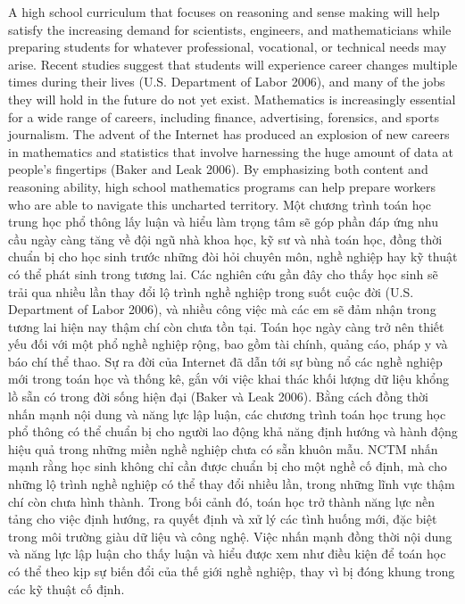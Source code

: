 \documentclass[
  10pt,
  a4paper,
  landscape,
  twoside,
  openany
]{scrbook}
\newcommand{\EN}[1]{#1}
\newcommand{\VI}[1]{#1}
\newcommand{\NOTE}[1]{#1}
\begin{document}
\TriPara
{
\EN{A high school curriculum that focuses on reasoning and sense making will help satisfy the increasing demand for scientists, engineers, and mathematicians while preparing students for whatever professional, vocational, or technical needs may arise. Recent studies suggest that students will experience career changes multiple times during their lives (U.S. Department of Labor 2006), and many of the jobs they will hold in the future do not yet exist. Mathematics is increasingly essential for a wide range of careers, including finance, advertising, forensics, and sports journalism. The advent of the Internet has produced an explosion of new careers in mathematics and statistics that involve harnessing the huge amount of data at people's fingertips (Baker and Leak 2006). By emphasizing both content and reasoning ability, high school mathematics programs can help prepare workers who are able to navigate this uncharted territory.}
}
{
\VI{Một chương trình toán học trung học phổ thông lấy luận và hiểu làm trọng tâm sẽ góp phần đáp ứng nhu cầu ngày càng tăng về đội ngũ nhà khoa học, kỹ sư và nhà toán học, đồng thời chuẩn bị cho học sinh trước những đòi hỏi chuyên môn, nghề nghiệp hay kỹ thuật có thể phát sinh trong tương lai. Các nghiên cứu gần đây cho thấy học sinh sẽ trải qua nhiều lần thay đổi lộ trình nghề nghiệp trong suốt cuộc đời (U.S. Department of Labor 2006), và nhiều công việc mà các em sẽ đảm nhận trong tương lai hiện nay thậm chí còn chưa tồn tại. Toán học ngày càng trở nên thiết yếu đối với một phổ nghề nghiệp rộng, bao gồm tài chính, quảng cáo, pháp y và báo chí thể thao. Sự ra đời của Internet đã dẫn tới sự bùng nổ các nghề nghiệp mới trong toán học và thống kê, gắn với việc khai thác khối lượng dữ liệu khổng lồ sẵn có trong đời sống hiện đại (Baker và Leak 2006). Bằng cách đồng thời nhấn mạnh nội dung và năng lực lập luận, các chương trình toán học trung học phổ thông có thể chuẩn bị cho người lao động khả năng định hướng và hành động hiệu quả trong những miền nghề nghiệp chưa có sẵn khuôn mẫu.}
}
{
\NOTE{NCTM nhấn mạnh rằng học sinh không chỉ cần được chuẩn bị cho một nghề cố định, mà cho những lộ trình nghề nghiệp có thể thay đổi nhiều lần, trong những lĩnh vực thậm chí còn chưa hình thành. Trong bối cảnh đó, toán học trở thành năng lực nền tảng cho việc định hướng, ra quyết định và xử lý các tình huống mới, đặc biệt trong môi trường giàu dữ liệu và công nghệ. Việc nhấn mạnh đồng thời nội dung và năng lực lập luận cho thấy luận và hiểu được xem như điều kiện để toán học có thể theo kịp sự biến đổi của thế giới nghề nghiệp, thay vì bị đóng khung trong các kỹ thuật cố định.}
}
\end{document}
